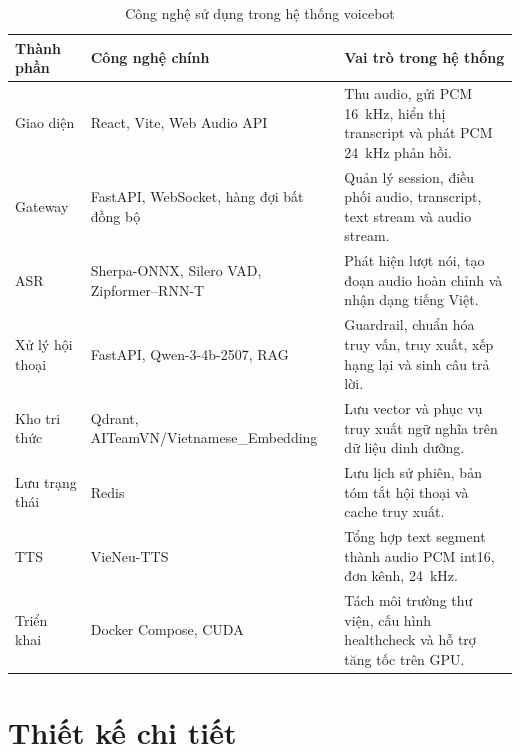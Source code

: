 \documentclass[a4paper,13pt,twoside]{report}
\begin{document}
\begin{table}[H]
    \centering
    \normalsize
    \renewcommand{\arraystretch}{1.3}
    \begin{tabularx}{\textwidth}{|>{\RaggedRight\arraybackslash}p{3.0cm}|>{\RaggedRight\arraybackslash}p{4.8cm}|>{\RaggedRight\arraybackslash}X|}
        \hline
        \textbf{Thành phần} & \textbf{Công nghệ chính}                        & \textbf{Vai trò trong hệ thống}                                             \\
        \hline
        Giao diện           & React, Vite, Web Audio API                      & Thu audio, gửi PCM 16~kHz, hiển thị transcript và phát PCM 24~kHz phản hồi. \\
        \hline
        Gateway             & FastAPI, WebSocket, hàng đợi bất đồng bộ        & Quản lý session, điều phối audio, transcript, text stream và audio stream.  \\
        \hline
        ASR                 & Sherpa-ONNX, Silero VAD, Zipformer--RNN-T       & Phát hiện lượt nói, tạo đoạn audio hoàn chỉnh và nhận dạng tiếng Việt.      \\
        \hline
        Xử lý hội thoại     & FastAPI, Qwen-3-4b-2507, RAG                    & Guardrail, chuẩn hóa truy vấn, truy xuất, xếp hạng lại và sinh câu trả lời. \\
        \hline
        Kho tri thức        & Qdrant, AITeamVN/\newline Vietnamese\_Embedding & Lưu vector và phục vụ truy xuất ngữ nghĩa trên dữ liệu dinh dưỡng.          \\
        \hline
        Lưu trạng thái      & Redis                                           & Lưu lịch sử phiên, bản tóm tắt hội thoại và cache truy xuất.                \\
        \hline
        TTS                 & VieNeu-TTS                                      & Tổng hợp text segment thành audio PCM int16, đơn kênh, 24~kHz.              \\
        \hline
        Triển khai          & Docker Compose, CUDA                            & Tách môi trường thư viện, cấu hình healthcheck và hỗ trợ tăng tốc trên GPU. \\
        \hline
    \end{tabularx}
    \caption{Công nghệ sử dụng trong hệ thống voicebot}
    \label{tab:system-technologies}
\end{table}

\section{Thiết kế chi tiết}
\end{document}
